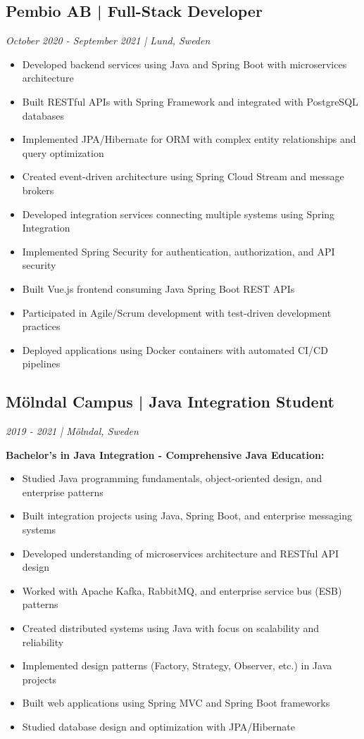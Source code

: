 \documentclass[11pt,a4paper]{article}
\begin{document}
\subsection*{Pembio AB | Full-Stack Developer}
\textit{October 2020 - September 2021 | Lund, Sweden}

\begin{itemize}[leftmargin=*, itemsep=2pt]
\item Developed backend services using Java and Spring Boot with microservices architecture
\item Built RESTful APIs with Spring Framework and integrated with PostgreSQL databases
\item Implemented JPA/Hibernate for ORM with complex entity relationships and query optimization
\item Created event-driven architecture using Spring Cloud Stream and message brokers
\item Developed integration services connecting multiple systems using Spring Integration
\item Implemented Spring Security for authentication, authorization, and API security
\item Built Vue.js frontend consuming Java Spring Boot REST APIs
\item Participated in Agile/Scrum development with test-driven development practices
\item Deployed applications using Docker containers with automated CI/CD pipelines
\end{itemize}

\subsection*{Mölndal Campus | Java Integration Student}
\textit{2019 - 2021 | Mölndal, Sweden}

\textbf{Bachelor's in Java Integration - Comprehensive Java Education:}
\begin{itemize}[leftmargin=*, itemsep=2pt]
\item Studied Java programming fundamentals, object-oriented design, and enterprise patterns
\item Built integration projects using Java, Spring Boot, and enterprise messaging systems
\item Developed understanding of microservices architecture and RESTful API design
\item Worked with Apache Kafka, RabbitMQ, and enterprise service bus (ESB) patterns
\item Created distributed systems using Java with focus on scalability and reliability
\item Implemented design patterns (Factory, Strategy, Observer, etc.) in Java projects
\item Built web applications using Spring MVC and Spring Boot frameworks
\item Studied database design and optimization with JPA/Hibernate
\end{itemize}
\end{document}
